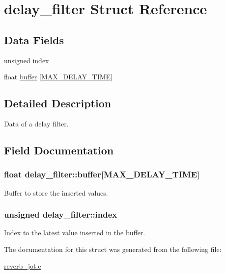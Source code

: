 \hypertarget{structdelay__filter}{\section{delay\-\_\-filter Struct Reference}
\label{structdelay__filter}
}
\subsection*{Data Fields}
\begin{DoxyCompactItemize}
\item 
unsigned \hyperlink{structdelay__filter_a7e5aab680dba8c144add99d4cd3dba3c}{index}
\item 
float \hyperlink{structdelay__filter_a7088bc142cec2c8cac8c47b60a9af09d}{buffer} \mbox{[}\hyperlink{reverb__jot_8c_a92d268dc3052f4e79fedd139859b0c8f}{M\-A\-X\-\_\-\-D\-E\-L\-A\-Y\-\_\-\-T\-I\-M\-E}\mbox{]}
\end{DoxyCompactItemize}


\subsection{Detailed Description}
Data of a delay filter. 

\subsection{Field Documentation}
\hypertarget{structdelay__filter_a7088bc142cec2c8cac8c47b60a9af09d}{
\subsubsection[{buffer}]{\setlength{\rightskip}{0pt plus 5cm}float delay\-\_\-filter\-::buffer\mbox{[}{\bf M\-A\-X\-\_\-\-D\-E\-L\-A\-Y\-\_\-\-T\-I\-M\-E}\mbox{]}}}\label{structdelay__filter_a7088bc142cec2c8cac8c47b60a9af09d}
Buffer to store the inserted values. \hypertarget{structdelay__filter_a7e5aab680dba8c144add99d4cd3dba3c}{
\subsubsection[{index}]{\setlength{\rightskip}{0pt plus 5cm}unsigned delay\-\_\-filter\-::index}}\label{structdelay__filter_a7e5aab680dba8c144add99d4cd3dba3c}
Index to the latest value inserted in the buffer. 

The documentation for this struct was generated from the following file\-:\begin{DoxyCompactItemize}
\item 
\hyperlink{reverb__jot_8c}{reverb\-\_\-jot.\-c}\end{DoxyCompactItemize}
